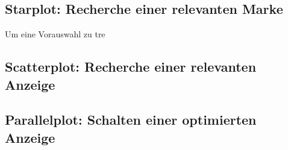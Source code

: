 \subsection{Starplot: Recherche einer relevanten Marke }

Um eine Vorauswahl zu tre
\subsection{Scatterplot: Recherche einer relevanten Anzeige }
\subsection{Parallelplot: Schalten einer optimierten Anzeige}